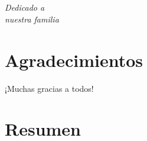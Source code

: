 \documentclass[a4paper,openright,12pt]{book}
\begin{document}

\chapter*{}

\begin{flushright}
\textit{Dedicado a \\
nuestra familia}
\end{flushright}


\chapter*{Agradecimientos} %
 
¡Muchas gracias a todos!
\chapter*{Resumen} %
\end{document}

